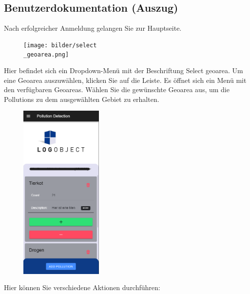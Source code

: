 \documentclass[a4paper,12pt]{article}
\begin{document}
\clearpage
\subsection{Benutzerdokumentation (Auszug)}
\label{sec:benutzerdokumentation}
Nach erfolgreicher Anmeldung gelangen Sie zur Hauptseite.

\begin{figure}[h]
\centering
\texttt{[image: bilder/select\\\_geoarea.png]}
\end{figure}

\noindent Hier befindet sich ein Dropdown-Menü mit der Beschriftung \glqq Select geoarea\grqq{}. Um eine Geoarea auszuwählen, klicken Sie auf die Leiste. Es öffnet sich ein Menü mit den verfügbaren Geoareas. Wählen Sie die gewünschte Geoarea aus, um die Pollutions zu dem ausgewählten Gebiet zu erhalten.

\begin{figure}[h]
\centering
\includegraphics[width=0.365\textwidth]{bilder/pollutions1.png}
\end{figure}

\noindent Hier können Sie verschiedene Aktionen durchführen:
\end{document}
